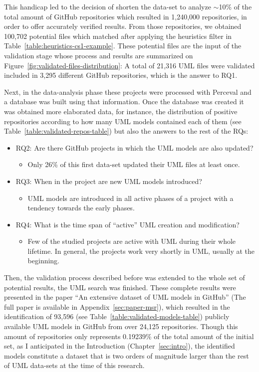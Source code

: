 \documentclass[a4paper, 12pt]{book}
\begin{document}
This handicap led to the decision of shorten the data-set to analyze $\sim$10\% of the total amount of GitHub repositories which resulted
in 1,240,000 repositories, in order to offer accurately verified results. From those repositories, we obtained 100,702 potential files
which matched after applying the heuristics filter in Table~\ref{table:heuristics-cs1-example}. These potential files are the input
of the validation stage whose process and results are summarized on Figure~\ref{fig:validated-files-distribution}: A total of 21,316 UML
files were validated included in 3,295 different GitHub repositories, which is the answer to RQ1.

Next, in the data-analysis phase these projects were processed with Perceval and a database was built using that information.
Once the database was created it was obtained more elaborated data, for instance, the distribution of positive repositories
according to how many UML models contained each of them (see Table~\ref{table:validated-repos-table}) but also the answers to the rest
of the RQs:

\begin{itemize}
  \item RQ2: Are there GitHub projects in which the UML models are also updated?
  \begin{itemize}
    \item Only 26\% of this first data-set updated their UML files at least once.
  \end{itemize}
  \item RQ3: When in the project are new UML models introduced?
  \begin{itemize}
    \item UML models are introduced in all active phases of a project with a tendency towards the early phases.
  \end{itemize}
  \item RQ4: What is the time span of ``active'' UML creation and modification?
  \begin{itemize}
    \item Few of the studied projects are active with UML during their whole lifetime.
    In general, the projects work very shortly in UML, usually at the beginning.
  \end{itemize}
\end{itemize}

Then, the validation process described before was extended to the whole set of potential results, the UML search was finished.
These complete results were presented in the paper ``An extensive dataset of UML models in GitHub'' (The full paper is available in Appendix~\ref{sec:paper-msr}),
which resulted in the identification of 93,596 (see Table~\ref{table:validated-models-table}) publicly available UML models
in GitHub from over 24,125 repositories. Though this amount of repositories only represents 0.19239\% of the total amount of the initial set,
as I anticipated in the Introduction (Chapter~\ref{sec:intro}), the identified models constitute a dataset that is two orders of magnitude larger than the
rest of UML data-sets at the time of this research.
\end{document}
